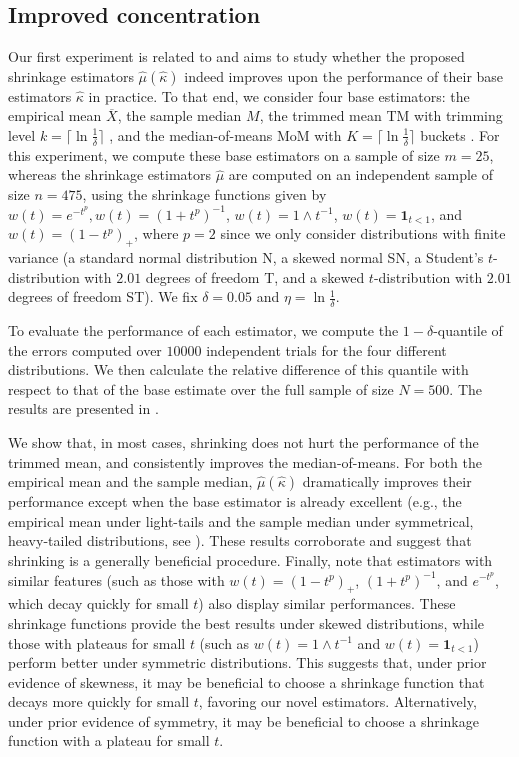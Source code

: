 \documentclass{article}
\theoremstyle{plain}
\theoremstyle{definition}
\begin{document}
\subsection{Improved concentration}\label{subsec:exp_improved} 
Our first experiment is related to  and aims to study whether the proposed shrinkage estimators \( \widehat{\mu }(\widehat{\kappa } )  \)  indeed improves upon the performance of their base estimators \( \widehat{\kappa }  \) in practice. To that end, we consider four base estimators: the empirical mean \( \overline{X} \), the sample median \( M \), the trimmed mean TM with trimming level $k = \lceil \ln \frac{1}{\delta} \rceil$ \citep{oliveira2025finite}, and the median-of-means MoM with $K = \lceil \ln \frac{1}{\delta} \rceil$ buckets \citep{lerasle2011robust}. For this experiment, we compute these base estimators on a sample of size \( m=25 \), whereas the shrinkage estimators \( \widehat{\mu} \)  are computed on an independent sample of size \( n=475 \), using the shrinkage functions given by \( w(t)=e^{-t^p},w(t)=(1+t^p)^{-1}\), \(w(t)=1\wedge t^{-1}\), \(w(t)=\mathbf{1}_{t<1}\), and \( w(t)=(1-t^p)_+ \), where \( p=2 \) since we only consider distributions with finite variance (a standard normal distribution N, a skewed normal SN, a Student's \( t \)-distribution with \( 2.01 \) degrees of freedom T, and a skewed \( t \)-distribution with \( 2.01 \) degrees of freedom ST). We fix \( \delta=0.05 \) and \( \eta = \ln \frac{1}{\delta } \).  

To evaluate the performance of each estimator, we compute the \( 1-\delta  \)-quantile of the errors computed over \( 10000 \) independent trials for the four different distributions. We then calculate the relative difference of this quantile with respect to that of the base estimate over the full sample of size \( N=500 \). The results are presented in .

We show that, in most cases, shrinking does not hurt the performance of the trimmed mean, and consistently improves the median-of-means. For both the empirical mean and the sample median, \( \widehat{\mu } (\widehat{\kappa } ) \) dramatically improves their performance except when the base estimator is already excellent (e.g., the empirical mean under light-tails and the sample median under symmetrical, heavy-tailed distributions, see ). These results corroborate  and suggest that shrinking is a generally beneficial procedure. 
Finally, note that estimators with similar features (such as those with $w(t) = (1-t^p)_+$, $(1+t^p)^{-1}$, and \( e^{-t^p} \), which decay quickly for small $t$) also display similar performances. These shrinkage functions provide the best results under skewed distributions, while those with plateaus for small $t$ (such as $w(t) = 1 \wedge t^{-1}$ and $w(t) = \mathbf{1}_{t < 1}$) perform better under symmetric distributions. This suggests that, under prior evidence of skewness, it may be beneficial to choose a shrinkage function that decays more quickly for small $t$, favoring our novel estimators. Alternatively, under prior evidence of symmetry, it may be beneficial to choose a shrinkage function with a plateau for small $t$.
\end{document}
